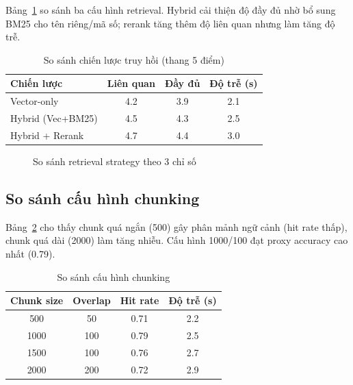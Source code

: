 \documentclass[10pt, conference, a4paper, compsocconf]{IEEEtran}
\begin{document}
Bảng~\ref{tab:retrieval-compare} so sánh ba cấu hình retrieval. Hybrid cải thiện độ đầy đủ nhờ bổ sung BM25 cho tên riêng/mã số; rerank tăng thêm độ liên quan nhưng làm tăng độ trễ.

\begin{table}[t]
\renewcommand{\arraystretch}{1.15}
\caption{So sánh chiến lược truy hồi (thang 5 điểm)}
\label{tab:retrieval-compare}
\centering
\begin{tabular}{|l|c|c|c|}
\hline
Chiến lược & Liên quan & Đầy đủ & Độ trễ (s) \\
\hline
Vector-only & 4.2 & 3.9 & 2.1 \\
\hline
Hybrid (Vec+BM25) & 4.5 & 4.3 & 2.5 \\
\hline
Hybrid + Rerank & 4.7 & 4.4 & 3.0 \\
\hline
\end{tabular}
\end{table}

\begin{figure}[t]
\centering
{}
\caption{So sánh retrieval strategy theo 3 chỉ số}
\label{fig:retrieval-chart}
\end{figure}

\subsection{So sánh cấu hình chunking}

Bảng~\ref{tab:chunk-compare} cho thấy chunk quá ngắn (500) gây phân mảnh ngữ cảnh (hit rate thấp), chunk quá dài (2000) làm tăng nhiễu. Cấu hình 1000/100 đạt proxy accuracy cao nhất (0.79).

\begin{table}[t]
\renewcommand{\arraystretch}{1.1}
\caption{So sánh cấu hình chunking}
\label{tab:chunk-compare}
\centering
\begin{tabular}{|c|c|c|c|}
\hline
Chunk size & Overlap & Hit rate & Độ trễ (s) \\
\hline
500 & 50 & 0.71 & 2.2 \\
\hline
1000 & 100 & 0.79 & 2.5 \\
\hline
1500 & 100 & 0.76 & 2.7 \\
\hline
2000 & 200 & 0.72 & 2.9 \\
\hline
\end{tabular}
\end{table}
\end{document}
